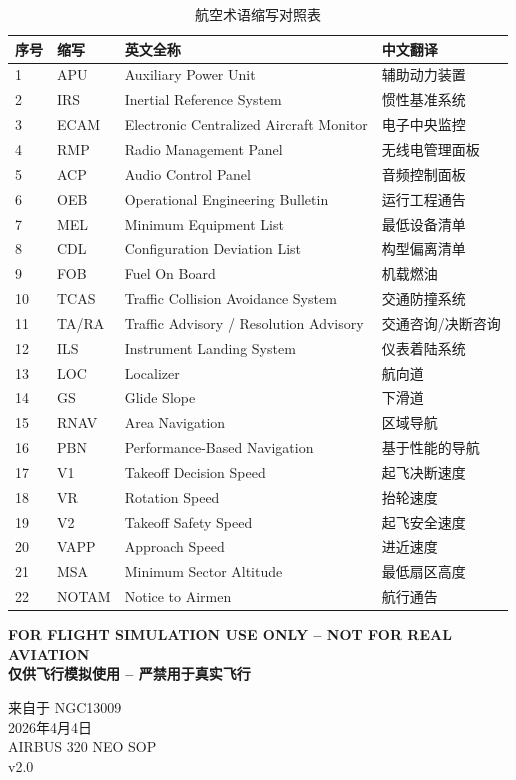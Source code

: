 \documentclass[a4paper,10pt]{article}
\begin{document}
\begin{table}[htbp]
\centering
\caption{航空术语缩写对照表}
\begin{tabular}{@{}p{1.2cm}p{2cm}p{6cm}p{3cm}@{}}
\toprule
序号 & 缩写 & 英文全称 & 中文翻译 \\
\midrule
1  & APU   & Auxiliary Power Unit                    & 辅助动力装置 \\
2  & IRS   & Inertial Reference System               & 惯性基准系统 \\
3  & ECAM  & Electronic Centralized Aircraft Monitor & 电子中央监控 \\
4  & RMP   & Radio Management Panel                  & 无线电管理面板 \\
5  & ACP   & Audio Control Panel                     & 音频控制面板 \\
6  & OEB   & Operational Engineering Bulletin        & 运行工程通告 \\
7  & MEL   & Minimum Equipment List                  & 最低设备清单 \\
8  & CDL   & Configuration Deviation List            & 构型偏离清单 \\
9  & FOB   & Fuel On Board                           & 机载燃油 \\
10 & TCAS  & Traffic Collision Avoidance System      & 交通防撞系统 \\
11 & TA/RA & Traffic Advisory / Resolution Advisory  & 交通咨询/决断咨询 \\
12 & ILS   & Instrument Landing System               & 仪表着陆系统 \\
13 & LOC   & Localizer                               & 航向道 \\
14 & GS    & Glide Slope                             & 下滑道 \\
15 & RNAV  & Area Navigation                         & 区域导航 \\
16 & PBN   & Performance-Based Navigation            & 基于性能的导航 \\
17 & V1    & Takeoff Decision Speed                  & 起飞决断速度 \\
18 & VR    & Rotation Speed                          & 抬轮速度 \\
19 & V2    & Takeoff Safety Speed                    & 起飞安全速度 \\
20 & VAPP  & Approach Speed                          & 进近速度 \\
21 & MSA   & Minimum Sector Altitude                 & 最低扇区高度 \\
22 & NOTAM & Notice to Airmen                        & 航行通告 \\
\bottomrule
\end{tabular}
\end{table}
\vspace{2.8cm}
\par
\scriptsize
\color{gray}

\textbf{FOR FLIGHT SIMULATION USE ONLY -- NOT FOR REAL AVIATION}\\
\textbf{仅供飞行模拟使用 -- 严禁用于真实飞行}\\

\vspace{3pt}

来自于 NGC13009 \\
2026年4月4日 \\
AIRBUS 320 NEO SOP\\
v2.0 \\
\endgroup
\end{document}

